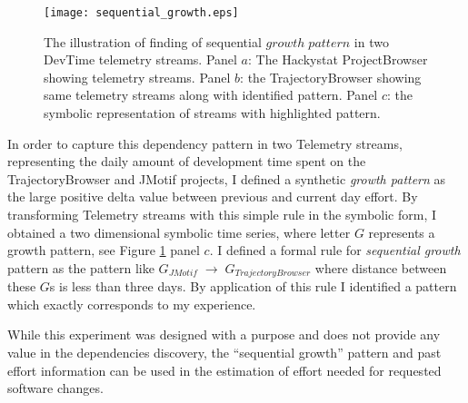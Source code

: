 \begin{figure}[tbp]
   \centering
   \texttt{[image: sequential\_growth.eps]}
   \caption{The illustration of finding of sequential $growth \; pattern$ in two DevTime telemetry streams. Panel $a$: The Hackystat ProjectBrowser showing telemetry streams. Panel $b$: the TrajectoryBrowser showing same telemetry streams along with identified pattern. Panel $c$: the symbolic representation of streams with highlighted pattern.}
   \label{fig:sequential_growth}
\end{figure}

In order to capture this dependency pattern in two Telemetry streams, representing the daily amount of development time spent on the TrajectoryBrowser and JMotif projects, I defined a synthetic \textit{growth pattern} as the large positive delta value between previous and current day effort. By transforming Telemetry streams with this simple rule in the symbolic form, I obtained a two dimensional symbolic time series, where letter $G$ represents a growth pattern, see Figure \ref{fig:sequential_growth} panel $c$. I defined a formal rule for \textit{sequential growth} pattern as the pattern like $G_{JMotif}\; \rightarrow \; G_{TrajectoryBrowser}$ where distance between these $G$s is less than three days. By application of this rule I identified a pattern which exactly corresponds to my experience. 

While this experiment was designed with a purpose and does not provide any value in the dependencies discovery, the ``sequential growth'' pattern and past effort information can be used in the estimation of effort needed for requested software changes.

